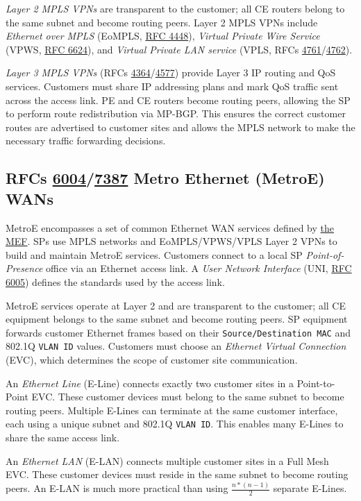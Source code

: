 \documentclass[12pt]{article}
\newcommand{\rfc}[1]{\href{https://datatracker.ietf.org/doc/html/rfc#1}{#1}}
\newcommand{\RFC}[1]{\href{https://datatracker.ietf.org/doc/html/rfc#1}{RFC #1}}
\begin{document}
	\textit{Layer 2 MPLS VPNs} are transparent to the customer; all CE routers belong to the same subnet and become routing peers. Layer 2 MPLS VPNs include \textit{Ethernet over MPLS} (EoMPLS, \RFC{4448}), \textit{Virtual Private Wire Service} (VPWS, \RFC{6624}), and \textit{Virtual Private LAN service} (VPLS, RFCs \rfc{4761}/\rfc{4762}).

	\textit{Layer 3 MPLS VPNs} (RFCs \rfc{4364}/\rfc{4577}) provide Layer 3 IP routing and QoS services. Customers must share IP addressing plans and mark QoS traffic sent across the access link. PE and CE routers become routing peers, allowing the SP to perform route redistribution via MP-BGP. This ensures the correct customer routes are advertised to customer sites and allows the MPLS network to make the necessary traffic forwarding decisions.


	\subsection[RFCs 6004/7387 MetroE WANs]{RFCs \rfc{6004}/\rfc{7387} Metro Ethernet (MetroE) WANs \label{subsec:METROE}}
	MetroE encompasses a set of common Ethernet WAN services defined by \href{www.mef.net}{the MEF}. SPs use MPLS networks and EoMPLS/VPWS/VPLS Layer 2 VPNs to build and maintain MetroE services. Customers connect to a local SP \textit{Point-of-Presence} office via an Ethernet access link. A \textit{User Network Interface} (UNI, \RFC{6005}) defines the standards used by the access link.

	MetroE services operate at Layer 2 and are transparent to the customer; all CE equipment belongs to the same subnet and become routing peers. SP equipment forwards customer Ethernet frames based on their \texttt{Source/Destination MAC} and 802.1Q \texttt{VLAN ID} values. Customers must choose an \textit{Ethernet Virtual Connection} (EVC), which determines the scope of customer site communication.
	
	An \textit{Ethernet Line} (E-Line) connects exactly two customer sites in a Point-to-Point EVC. These customer devices must belong to the same subnet to become routing peers. Multiple E-Lines can terminate at the same customer interface, each using a unique subnet and 802.1Q \texttt{VLAN ID}. This enables many E-Lines to share the same access link.

	An \textit{Ethernet LAN} (E-LAN) connects multiple customer sites in a Full Mesh EVC. These customer devices must reside in the same subnet to become routing peers. An E-LAN is much more practical than using $\frac{n * (n-1)}{2}$ separate E-Lines.
\end{document}
